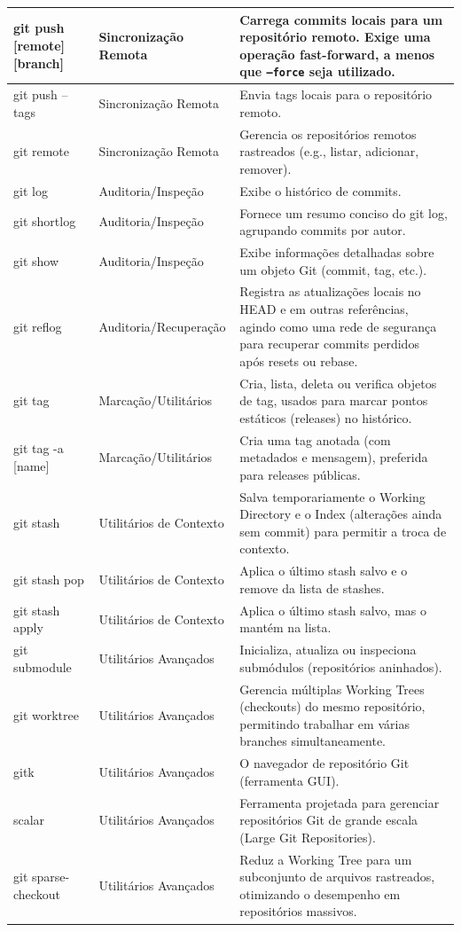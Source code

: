 \begin{longtable}{|p{3cm}|p{4cm}|p{7cm}|}
    \hline
    git push [remote][branch] & Sincronização Remota & Carrega commits locais para um repositório remoto. Exige uma operação fast-forward, a menos que \texttt{--force} seja utilizado. \\
    \hline
    git push --tags & Sincronização Remota & Envia tags locais para o repositório remoto. \\
    \hline
    git remote & Sincronização Remota & Gerencia os repositórios remotos rastreados (e.g., listar, adicionar, remover). \\
    \hline
    git log & Auditoria/Inspeção & Exibe o histórico de commits. \\
    \hline
    git shortlog & Auditoria/Inspeção & Fornece um resumo conciso do git log, agrupando commits por autor. \\
    \hline
    git show & Auditoria/Inspeção & Exibe informações detalhadas sobre um objeto Git (commit, tag, etc.). \\
    \hline
    git reflog & Auditoria/Recuperação & Registra as atualizações locais no HEAD e em outras referências, agindo como uma rede de segurança para recuperar commits perdidos após resets ou rebase. \\
    \hline
    git tag & Marcação/Utilitários & Cria, lista, deleta ou verifica objetos de tag, usados para marcar pontos estáticos (releases) no histórico. \\
    \hline
    git tag -a [name] & Marcação/Utilitários & Cria uma tag anotada (com metadados e mensagem), preferida para releases públicas. \\
    \hline
    git stash & Utilitários de Contexto & Salva temporariamente o Working Directory e o Index (alterações ainda sem commit) para permitir a troca de contexto. \\
    \hline
    git stash pop & Utilitários de Contexto & Aplica o último stash salvo e o remove da lista de stashes. \\
    \hline
    git stash apply & Utilitários de Contexto & Aplica o último stash salvo, mas o mantém na lista. \\
    \hline
    git submodule & Utilitários Avançados & Inicializa, atualiza ou inspeciona submódulos (repositórios aninhados). \\
    \hline
    git worktree & Utilitários Avançados & Gerencia múltiplas Working Trees (checkouts) do mesmo repositório, permitindo trabalhar em várias branches simultaneamente. \\
    \hline
    gitk & Utilitários Avançados & O navegador de repositório Git (ferramenta GUI). \\
    \hline
    scalar & Utilitários Avançados & Ferramenta projetada para gerenciar repositórios Git de grande escala (Large Git Repositories). \\
    \hline
    git sparse-checkout & Utilitários Avançados & Reduz a Working Tree para um subconjunto de arquivos rastreados, otimizando o desempenho em repositórios massivos. \\
    \hline
\end{longtable}